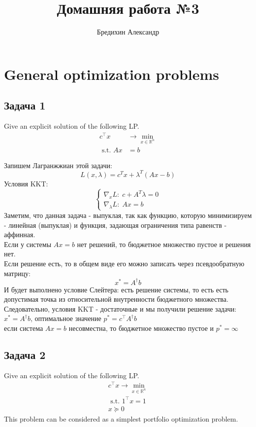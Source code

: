 \documentclass[a4paper,12pt]{article} %
\author{Бредихин Александр}
\title{Домашняя работа №3}
\date{}
\begin{document}
\maketitle
\newpage

\section*{General optimization problems}
\subsection*{Задача 1}
Give an explicit solution of the following LP.
$$
\begin{aligned}
c^{\top} x & \rightarrow \min _{x \in \mathbb{R}^{n}} \\
\text { s.t. } A x &=b
\end{aligned}
$$

Запишем Лагранжжиан этой задачи: 
$$
L(x, \lambda)=c^{T} x+\lambda^{T}(A x-b)
$$
Условия KKT:
$$
\left\{\begin{array}{l}
\nabla_x L: \; c+A^{T} \lambda=0 \\
\nabla_{\lambda} L: \; A x=b
\end{array}\right.
$$
Заметим, что данная задача - выпуклая, так как функцию, которую минимизируем - линейная (выпуклая) и функция, задающая ограничения типа равенств - аффинная.\\
Если у системы $ Ax = b $ нет решений, то бюджетное множество пустое и решения нет. \\
Если решение есть, то в общем виде его можно записать через псевдообратную матрицу: 
$$
x^{*}=A^{\dagger} b
$$
И будет выполнено условие Слейтера: есть решение системы, то есть есть допустимая точка из относительной внутренности бюджетного множества. Следовательно, условия KKT - достаточные и мы получили решение задачи:\\ $ x^{*}=A^{\dagger} b $, оптимальное значение $ p^* = c^{\top} A^{\dagger} b $\\
если система $ Ax = b $ несовместна, то бюджетное множество пустое и $ p^* = \infty $

\subsection*{Задача 2}
Give an explicit solution of the following LP.
$$
\begin{array}{l}
c^{\top} x \rightarrow \min\limits_{x \in \mathbb{R}^{n}} \\
\text { s.t. } 1^{\top} x=1 \\
x \succeq 0
\end{array}
$$
This problem can be considered as a simplest portfolio optimization problem.\\
\end{document}
